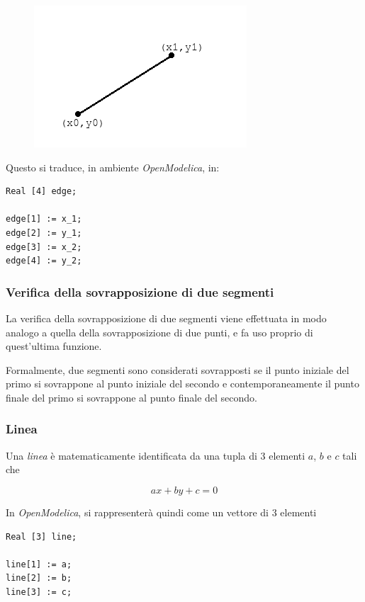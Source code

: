 \documentclass[10pt,a4paper]{article}
\newcommand{\modelicaclass}[1]{

}
\begin{document}
\begin{figure}[H]
\centering
\includegraphics[scale=0.5]{segmento.png}
\end{figure}

Questo si traduce, in ambiente \textit{OpenModelica}, in:

\begin{lstlisting}[language=Modelica]
Real [4] edge;

edge[1] := x_1;
edge[2] := y_1;
edge[3] := x_2;
edge[4] := y_2;
\end{lstlisting}

\subsubsection{Verifica della sovrapposizione di due segmenti}

La verifica della sovrapposizione di due segmenti viene effettuata in modo analogo a quella della sovrapposizione di due punti, e fa uso proprio di quest'ultima funzione.

Formalmente, due segmenti sono considerati sovrapposti se il punto iniziale del primo si sovrappone al punto iniziale del secondo e contemporaneamente il punto finale del primo si sovrappone al punto finale del secondo.

\modelicaclass{EdgesAreClose.mo}

\subsubsection{Linea}

Una \textit{linea} è matematicamente identificata da una tupla di 3 elementi $a$, $b$ e $c$ tali che

\[
a x + b y + c = 0
\]

In \textit{OpenModelica}, si rappresenterà quindi come un vettore di 3 elementi
\begin{lstlisting}[language=Modelica]
Real [3] line;

line[1] := a;
line[2] := b;
line[3] := c;
\end{lstlisting}
\end{document}
